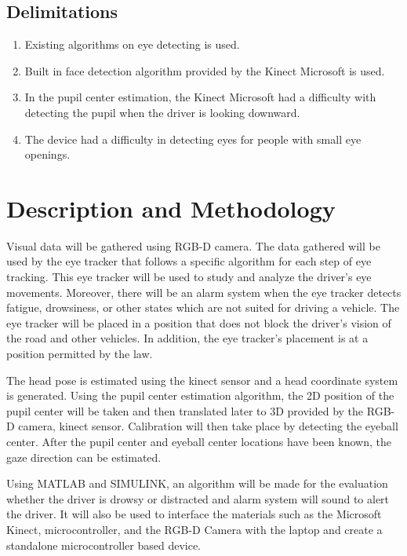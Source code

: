 \subsection{Delimitations}
\begin{enumerate}
	
	\item Existing algorithms on eye detecting is used.
	
	\item Built in face detection algorithm provided by the Kinect Microsoft is used.
	
	\item In the pupil center estimation, the Kinect Microsoft had a difficulty with detecting the pupil when the driver is looking downward.
	
	\item The device had a difficulty in detecting eyes for people with small eye openings.
		
\end{enumerate}

\section{Description and Methodology}

Visual data will be gathered using RGB-D camera. The data gathered will be used by the eye tracker that follows a specific algorithm for each step of eye tracking. This eye tracker will be used to study and analyze the driver’s eye movements. Moreover, there will be an alarm system when the eye tracker detects fatigue, drowsiness, or other states which are not suited for driving a vehicle. The eye tracker will be placed in a position that does not block the driver’s vision of the road and other vehicles. In addition, the eye tracker’s placement is at a position permitted by the law.

The head pose is estimated using the kinect sensor and a head coordinate system is generated. Using the pupil center estimation algorithm, the 2D position of the pupil center will be taken and then translated later to 3D provided by the RGB-D camera, kinect sensor. Calibration will then take place by detecting the eyeball center. After the pupil center and eyeball center locations have been known, the gaze direction can be estimated.

Using MATLAB and SIMULINK, an algorithm will be made for the evaluation whether the driver is drowsy or distracted and alarm system will sound to alert the driver. It will also be used to interface the materials such as the Microsoft Kinect, microcontroller, and the RGB-D Camera with the laptop and create a standalone microcontroller based device. 

